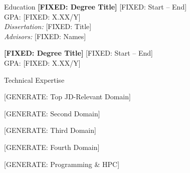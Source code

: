 \documentclass{cv}
\begin{document}
\begin{rSection}{Education}
\textbf{[FIXED: Degree Title]} \hfill {[FIXED: Start -- End]}\\
[FIXED: Institution, Location] \hfill GPA: [FIXED: X.XX/Y]\\
\textit{Dissertation:} [FIXED: Title]\\
\textit{Advisors:} [FIXED: Names]

\textbf{[FIXED: Degree Title]} \hfill {[FIXED: Start -- End]}\\
[FIXED: Institution, Location] \hfill GPA: [FIXED: X.XX/Y]
\end{rSection}
\vspace{-0.0cm}

%

\begin{rSection}{Technical Expertise}

\begin{skillgroup}{[GENERATE: Top JD-Relevant Domain]}
\skilldash{[GENERATE]}
\skilldash{[GENERATE]}
\end{skillgroup}

\begin{skillgroup}{[GENERATE: Second Domain]}
\skilldash{[GENERATE]}
\skilldash{[GENERATE]}
\skilldash{[GENERATE]}
\end{skillgroup}

\begin{skillgroup}{[GENERATE: Third Domain]}
\skilldash{[GENERATE]}
\skilldash{[GENERATE]}
\end{skillgroup}

\begin{skillgroup}{[GENERATE: Fourth Domain]}
\skilldash{[GENERATE]}
\skilldash{[GENERATE]}
\end{skillgroup}

\begin{skillgroup}{[GENERATE: Programming \& HPC]}
\skilldash{[GENERATE]}
\skilldash{[GENERATE]}
\end{skillgroup}

\end{rSection}
\vspace{-0.0cm}
\end{document}
